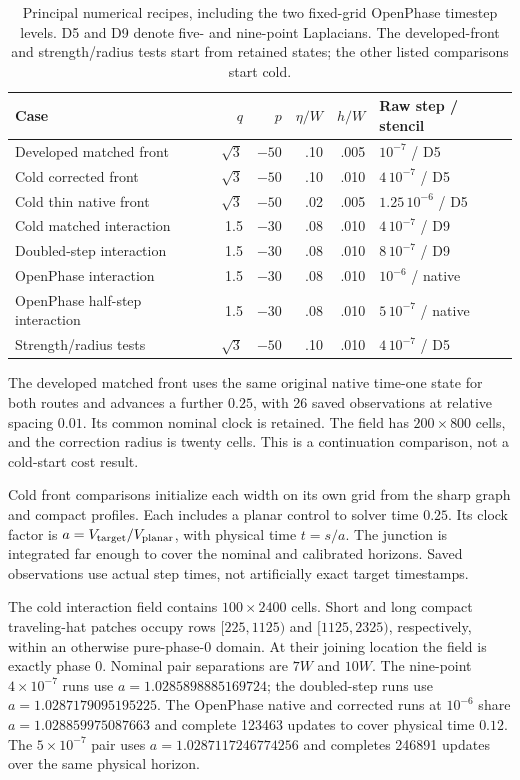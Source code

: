 \documentclass[a4paper,11pt]{article}
\begin{document}
\begin{table}[htbp]
\caption{Principal numerical recipes, including the two fixed-grid OpenPhase timestep levels. D5 and D9 denote five- and nine-point Laplacians. The developed-front and strength/radius tests start from retained states; the other listed comparisons start cold.}
\label{tab:recipes}
\centering\small
\begin{tabular}{lrrrrl}
\toprule
Case & $q$ & $p$ & $\eta/W$ & $h/W$ & Raw step / stencil\\
\midrule
Developed matched front & $\sqrt3$ & $-50$ & .10 & .005 & $10^{-7}$ / D5\\
Cold corrected front & $\sqrt3$ & $-50$ & .10 & .010 & $4\,10^{-7}$ / D5\\
Cold thin native front & $\sqrt3$ & $-50$ & .02 & .005 & $1.25\,10^{-6}$ / D5\\
Cold matched interaction & 1.5 & $-30$ & .08 & .010 & $4\,10^{-7}$ / D9\\
Doubled-step interaction & 1.5 & $-30$ & .08 & .010 & $8\,10^{-7}$ / D9\\
OpenPhase interaction & 1.5 & $-30$ & .08 & .010 & $10^{-6}$ / native\\
OpenPhase half-step interaction & 1.5 & $-30$ & .08 & .010 & $5\,10^{-7}$ / native\\
Strength/radius tests & $\sqrt3$ & $-50$ & .10 & .010 & $4\,10^{-7}$ / D5\\
\bottomrule
\end{tabular}
\end{table}

The developed matched front uses the same original native time-one state for both routes and advances a further $0.25$, with 26 saved observations at relative spacing $0.01$. Its common nominal clock is retained. The field has $200\times800$ cells, and the correction radius is twenty cells. This is a continuation comparison, not a cold-start cost result.

Cold front comparisons initialize each width on its own grid from the sharp graph and compact profiles. Each includes a planar control to solver time $0.25$. Its clock factor is $a=V_{\rm target}/V_{\rm planar}$, with physical time $t=s/a$. The junction is integrated far enough to cover the nominal and calibrated horizons. Saved observations use actual step times, not artificially exact target timestamps.

The cold interaction field contains $100\times2400$ cells. Short and long compact traveling-hat patches occupy rows $[225,1125)$ and $[1125,2325)$, respectively, within an otherwise pure-phase-0 domain. At their joining location the field is exactly phase 0. Nominal pair separations are $7W$ and $10W$. The nine-point $4\times10^{-7}$ runs use $a=1.0285898885169724$; the doubled-step runs use $a=1.0287179095195225$. The OpenPhase native and corrected runs at $10^{-6}$ share $a=1.028859975087663$ and complete 123463 updates to cover physical time $0.12$. The $5\times10^{-7}$ pair uses $a=1.0287117246774256$ and completes 246891 updates over the same physical horizon.
\end{document}
